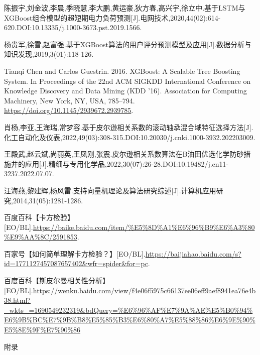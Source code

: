 \documentclass{MathModeling}
\begin{document}
\newpage
	\begin{spacing}{1.08}
	\begin{thebibliography}{99}
	陈振宇,刘金波,李晨,季晓慧,李大鹏,黄运豪,狄方春,高兴宇,徐立中.基于LSTM与XGBoost组合模型的超短期电力负荷预测[J].电网技术,2020,44(02):614-620.DOI:10.13335/j.1000-3673.pst.2019.1566.

	杨贵军,徐雪,赵富强.基于XGBoost算法的用户评分预测模型及应用[J].数据分析与知识发现,2019,3(01):118-126.

	Tianqi Chen and Carlos Guestrin. 2016. XGBoost: A Scalable Tree Boosting System. In Proceedings of the 22nd ACM SIGKDD International Conference on Knowledge Discovery and Data Mining (KDD '16). Association for Computing Machinery, New York, NY, USA, 785–794. \url{https://doi.org/10.1145/2939672.2939785}.

	肖杨,李亚,王海瑞,常梦容.基于皮尔逊相关系数的滚动轴承混合域特征选择方法[J].化工自动化及仪表,2022,49(03):308-315.DOI:10.20030/j.cnki.1000-3932.202203009.
	
	王殿武,赵云斌,尚丽英,王凤刚,张震.皮尔逊相关系数算法在B油田优选化学防砂措施井的应用[J].精细与专用化学品,2022,30(07):26-28.DOI:10.19482/j.cn11-3237.2022.07.07.

	汪海燕,黎建辉,杨风雷.支持向量机理论及算法研究综述[J].计算机应用研究,2014,31(05):1281-1286.

	百度百科【卡方检验】[EO/BL].\url{https://baike.baidu.com/item/%E5%8D%A1%E6%96%B9%E6%A3%80%E9%AA%8C/2591853}.

	百家号【如何简单理解卡方检验？】[EO/BL].\url{https://baijiahao.baidu.com/s?id=1771127457087657402&wfr=spider&for=pc}.

	百度百科【斯皮尔曼相关性分析】[EO/BL].\url{https://wenku.baidu.com/view/f4e06f5975c66137ee06eff9aef8941ea76e4b38.html?_wkts_=1690549232319&bdQuery=%E6%96%AF%E7%9A%AE%E5%B0%94%E6%9B%BC%E7%9B%B8%E5%85%B3%E6%80%A7%E5%88%86%E6%9E%90%E5%8E%9F%E7%90%86}

	\end{thebibliography}
	\end{spacing}
	\newpage


	\begin{center}
		\heiti{} 附\hspace{2pc}录
	\end{center}
\end{document}
